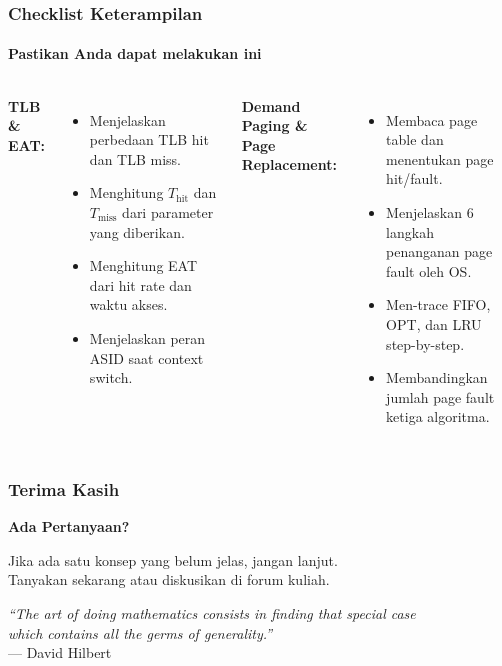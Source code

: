 \documentclass[t,aspectratio=169,xcolor=dvipsnames]{beamer}
\begin{document}
\begin{frame}
    \frametitle{Checklist Keterampilan}
    \framesubtitle{Pastikan Anda dapat melakukan ini}
    \small

    \begin{columns}[T]
        \textbf{TLB \& EAT:}
        \begin{itemize}
            \item[$\square$] Menjelaskan perbedaan TLB hit dan TLB miss.
            \item[$\square$] Menghitung $T_{\text{hit}}$ dan $T_{\text{miss}}$ dari parameter yang diberikan.
            \item[$\square$] Menghitung EAT dari hit rate dan waktu akses.
            \item[$\square$] Menjelaskan peran ASID saat context switch.
        \end{itemize}

        \textbf{Demand Paging \& Page Replacement:}
        \begin{itemize}
            \item[$\square$] Membaca page table dan menentukan page hit/fault.
            \item[$\square$] Menjelaskan 6 langkah penanganan page fault oleh OS.
            \item[$\square$] Men-trace FIFO, OPT, dan LRU step-by-step.
            \item[$\square$] Membandingkan jumlah page fault ketiga algoritma.
        \end{itemize}
    \end{columns}
\end{frame}

\begin{frame}
    \frametitle{Terima Kasih}
    \begin{center}
        \Huge \textbf{Ada Pertanyaan?}

        \vspace{0.8cm}
        \normalsize
        Jika ada satu konsep yang belum jelas, jangan lanjut.\\
        Tanyakan sekarang atau diskusikan di forum kuliah.

        \vspace{0.8cm}
        \small
        \textit{``The art of doing mathematics consists in finding that special case\\
        which contains all the germs of generality.''} \\
        \vspace{0.1cm}
        --- David Hilbert
    \end{center}
\end{frame}
\end{document}
